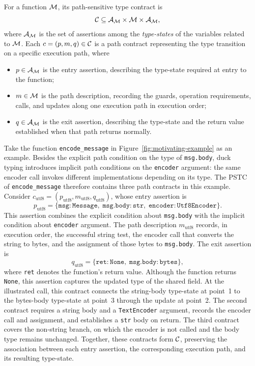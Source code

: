   \begin{definition}
  For a function $\mathcal{M}$, its path-sensitive type contract is
  \[
      \mathcal{C} \subseteq \mathcal{A}_{\mathcal{M}} \times \mathcal{M} \times \mathcal{A}_{\mathcal{M}},
  \]
  where $\mathcal{A}_{\mathcal{M}}$ is the set of assertions among the \textit{type-states} of the
  variables related to $\mathcal{M}$.
  Each $c=(p,m,q)\in\mathcal{C}$ is a path contract representing the type transition on a specific execution path, where
  \begin{itemize}
    \item $p\in\mathcal{A}_{\mathcal{M}}$ is the entry assertion, describing the type-state required at entry to the function; 
    \item $m\in\mathcal{M}$ is the path description, recording the guards, operation requirements, calls, and updates along one execution path in execution order; 
    \item $q\in\mathcal{A}_{\mathcal{M}}$ is the exit assertion, describing the type-state and the return value established when that path returns normally. 
  \end{itemize}
  \end{definition}


Take the function \texttt{encode\_message} in
Figure~\ref{fig:motivating-example} as an example.
Besides the explicit path condition on the type of
\texttt{msg.body}, duck typing introduces implicit path
conditions on the \texttt{encoder} argument: the same encoder call
invokes different implementations depending on its type.
The PSTC of \texttt{encode\_message} therefore contains three
path contracts in this example.
Consider $c_{\mathrm{utf8}}=(p_{\mathrm{utf8}},
m_{\mathrm{utf8}},q_{\mathrm{utf8}})$, whose entry assertion is
\[
p_{\mathrm{utf8}} =
\{ \texttt{msg}:\texttt{Message},\;
   \texttt{msg.body}:\texttt{str},\;
   \texttt{encoder}:\texttt{Utf8Encoder} \}.
\]
This assertion combines the explicit condition about \texttt{msg.body}
with the implicit condition about \texttt{encoder} argument. 
The path description $m_{\mathrm{utf8}}$ records, in execution
order, the successful string test, the encoder call that
converts the string to bytes, and the assignment of those
bytes to \texttt{msg.body}.
The exit assertion is
\[
q_{\mathrm{utf8}} =
\{ \texttt{ret}:\texttt{None},\;
   \texttt{msg.body}:\texttt{bytes} \},
\]
where \texttt{ret} denotes the function's return value.
Although the function returns \texttt{None}, this assertion
captures the updated type of the shared field.
At the illustrated call, this contract connects the
string-body type-state at point~1 to the bytes-body
type-state at point~3 through the update at point~2.
The second contract requires a string body and a
\texttt{TextEncoder} argument, records the encoder call
and assignment, and establishes a \texttt{str} body on return.
The third contract covers the non-string branch, on which
the encoder is not called and the body type remains unchanged.
Together, these contracts form $\mathcal{C}$, preserving the
association between each entry assertion, the corresponding
execution path, and its resulting type-state.


